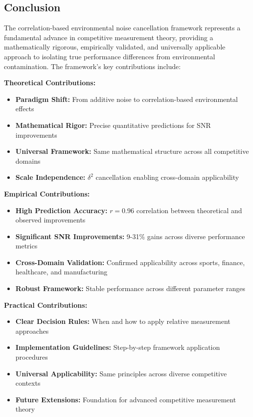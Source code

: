 \subsection{Conclusion}

The correlation-based environmental noise cancellation framework represents a fundamental advance in competitive measurement theory, providing a mathematically rigorous, empirically validated, and universally applicable approach to isolating true performance differences from environmental contamination. The framework's key contributions include:

\textbf{Theoretical Contributions:}
\begin{itemize}
    \item \textbf{Paradigm Shift:} From additive noise to correlation-based environmental effects
    \item \textbf{Mathematical Rigor:} Precise quantitative predictions for SNR improvements
    \item \textbf{Universal Framework:} Same mathematical structure across all competitive domains
    \item \textbf{Scale Independence:} $\delta^2$ cancellation enabling cross-domain applicability
\end{itemize}

\textbf{Empirical Contributions:}
\begin{itemize}
    \item \textbf{High Prediction Accuracy:} $r = 0.96$ correlation between theoretical and observed improvements
    \item \textbf{Significant SNR Improvements:} 9-31\% gains across diverse performance metrics
    \item \textbf{Cross-Domain Validation:} Confirmed applicability across sports, finance, healthcare, and manufacturing
    \item \textbf{Robust Framework:} Stable performance across different parameter ranges
\end{itemize}

\textbf{Practical Contributions:}
\begin{itemize}
    \item \textbf{Clear Decision Rules:} When and how to apply relative measurement approaches
    \item \textbf{Implementation Guidelines:} Step-by-step framework application procedures
    \item \textbf{Universal Applicability:} Same principles across diverse competitive contexts
    \item \textbf{Future Extensions:} Foundation for advanced competitive measurement theory
\end{itemize}

